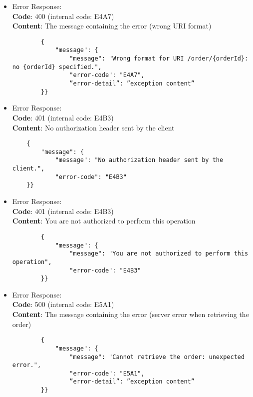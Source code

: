 \begin{itemize}
	\item Error Response:\\
	\textbf{Code}: 400 (internal code: E4A7)\\
	\textbf{Content}: The message containing the error (wrong URI format)\\
	\begin{verbatim}
		{
			"message": {
				"message": "Wrong format for URI /order/{orderId}: no {orderId} specified.",
				"error-code": "E4A7",
				”error-detail”: ”exception content”
		}}
	\end{verbatim}
	\item Error Response:\\
	\textbf{Code}: 401 (internal code: E4B3)\\
	\textbf{Content}: No authorization header sent by the client\\
	\begin{verbatim}
	{
		"message": {
			"message": "No authorization header sent by the client.",
			"error-code": "E4B3"
	}}
	\end{verbatim}	
	\item Error Response:\\
	\textbf{Code}: 401 (internal code: E4B3)\\
	\textbf{Content}: You are not authorized to perform this operation\\
	\begin{verbatim}
		{
			"message": {
				"message": "You are not authorized to perform this operation",
				"error-code": "E4B3"
		}}
	\end{verbatim}	
	\item Error Response:\\
	\textbf{Code}: 500 (internal code: E5A1)\\
	\textbf{Content}: The message containing the error (server error when retrieving the order)\\
	\begin{verbatim}
		{
			"message": {
				"message": "Cannot retrieve the order: unexpected error.",
				"error-code": "E5A1",
				”error-detail”: ”exception content”
		}}
	\end{verbatim}
	
\end{itemize}
